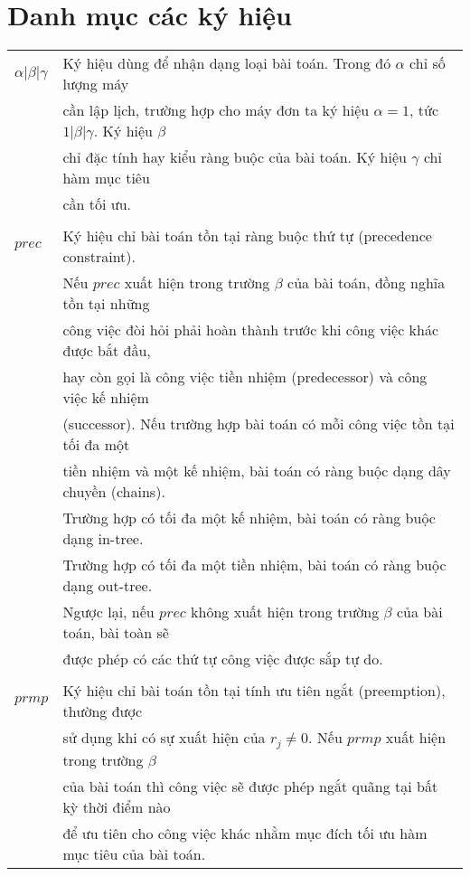 \documentclass[12pt,a4paper]{report}
\begin{document}
	\chapter*{Danh mục các ký hiệu}
	\thispagestyle{fancy}
	\begin{longtable}{l l}
		$\alpha | \beta | \gamma$ & Ký hiệu dùng để nhận dạng loại bài toán. Trong đó $\alpha$ chỉ số lượng máy \\
		& cần lập lịch, trường hợp cho máy đơn ta ký hiệu $\alpha = 1$, tức $1| \beta | \gamma$. Ký hiệu $\beta$ \\
		& chỉ đặc tính hay kiểu ràng buộc của bài toán. Ký hiệu $\gamma$ chỉ hàm mục tiêu \\
		& cần tối ưu. \\
		\\
		$prec$ & Ký hiệu chỉ bài toán tồn tại ràng buộc thứ tự (precedence constraint). \\
		& Nếu $prec$ xuất hiện trong trường $\beta$ của bài toán, đồng nghĩa tồn tại những \\
		& công việc đòi hỏi phải hoàn thành trước khi công việc khác được bắt đầu, \\
		& hay còn gọi là công việc tiền nhiệm (predecessor) và công việc kế nhiệm \\
		&(successor). Nếu trường hợp bài toán có mỗi công việc tồn tại tối đa một \\
		& tiền nhiệm và một kế nhiệm, bài toán có ràng buộc dạng dây chuyền (chains). \\
		& Trường hợp có tối đa một kế nhiệm, bài toán có ràng buộc dạng in-tree. \\
		& Trường hợp có tối đa một tiền nhiệm, bài toán có ràng buộc dạng out-tree. \\
		& Ngược lại, nếu $prec$ không xuất hiện trong trường $\beta$ của bài toán, bài toàn sẽ\\
		& được phép có các thứ tự công việc được sắp tự do. \\
		\\
		$prmp$ & Ký hiệu chỉ bài toán tồn tại tính ưu tiên ngắt (preemption), thường được \\
		& sử dụng khi có sự xuất hiện của $r_j \neq 0$. Nếu $prmp$ xuất hiện trong trường $\beta$ \\
		& của bài toán thì công việc sẽ được phép ngắt quãng tại bất kỳ thời điểm nào \\
		& để ưu tiên cho công việc khác nhằm mục đích tối ưu hàm mục tiêu của bài toán. \\

\end{longtable}
\end{document}
